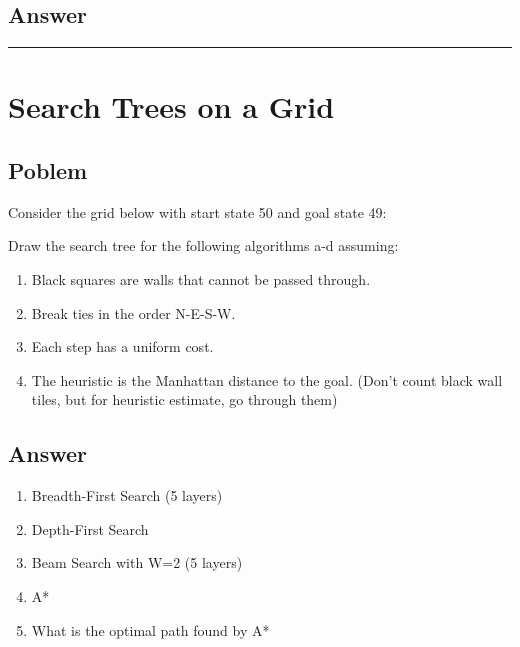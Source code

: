 \documentclass[11pt]{article}
\begin{document}
\begin{flushleft}
\subsection*{Answer}

\hspace{1cm}
\hrule
\section*{Search Trees on a Grid}

\subsection*{Poblem}
Consider the grid below with start state 50 and goal state 49:

Draw the search tree for the following algorithms a-d assuming: 
\begin{enumerate}
    \item Black squares are walls that cannot be passed through. 
    \item Break ties in the order N-E-S-W.
    \item Each step has a uniform cost.
    \item The heuristic is the Manhattan distance to the goal. (Don’t count
        black wall tiles, but for heuristic estimate, go through them)
\end{enumerate}

\subsection*{Answer}
\begin{enumerate}
    \item Breadth-First Search (5 layers)
    \item Depth-First Search
    \item Beam Search with W=2 (5 layers)
    \item A*
    \item What is the optimal path found by A*
\end{enumerate}

\end{flushleft}
\end{document}
